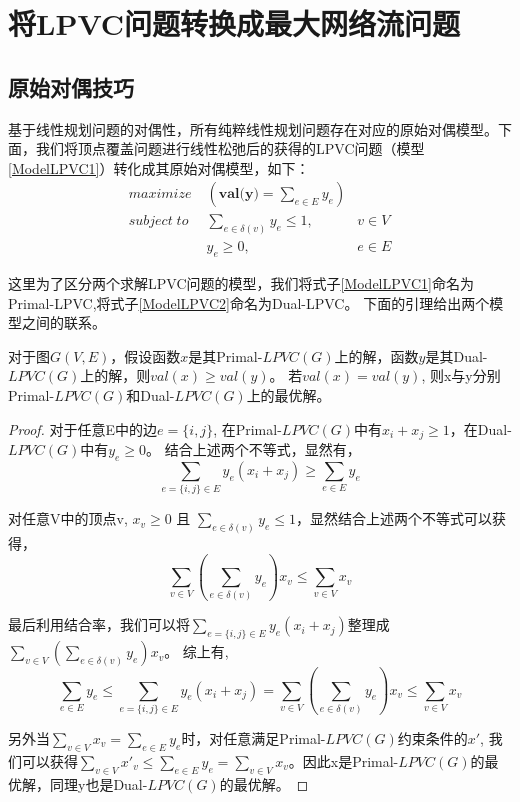 
\section{将LPVC问题转换成最大网络流问题}

\subsection{原始对偶技巧}
基于线性规划问题的对偶性，所有纯粹线性规划问题存在对应的原始对偶模型。下面，我们将顶点覆盖问题进行线性松弛后的获得的LPVC问题（模型\ref{ModelLPVC1}）转化成其原始对偶模型，如下：
\begin{equation} \label{ModelLPVC2} \begin{aligned}
  maximize\; & (\textbf{val(y)} = \sum_{e \in E}{y_e}) &\\
  subject\; to\; & \sum_{e \in \delta(v)}{y_e \le 1}, & v \in V \\
   & y_e \ge 0, & e \in E
\end{aligned} \end{equation}

这里为了区分两个求解LPVC问题的模型，我们将式子\ref{ModelLPVC1}命名为Primal-LPVC,将式子\ref{ModelLPVC2}命名为Dual-LPVC。
下面的引理给出两个模型之间的联系。
\begin{lemma} \label{relationBwtPrimalAndDual}
对于图$G(V, E)$，假设函数$x$是其Primal-$LPVC(G)$上的解，函数$y$是其Dual-$LPVC(G)$上的解，则$val(x) \ge val(y)$。
若$val(x) = val(y)$, 则x与y分别Primal-$LPVC(G)$和Dual-$LPVC(G)$上的最优解。
\end{lemma}
\begin{proof}
  对于任意E中的边$e = \{i, j\}$, 在Primal-$LPVC(G)$中有$x_i + x_j \ge 1$，在Dual-$LPVC(G)$中有$y_e \ge 0$。
  结合上述两个不等式，显然有，\[\sum\limits_{e=\{i, j\} \in E}{y_e(x_i + x_j)} \ge \sum\limits_{e \in E}{y_e}\]

  对任意V中的顶点v, $x_v \ge 0$ 且 $\sum_{e \in \delta(v)}{y_e} \le 1$，显然结合上述两个不等式可以获得，
  \[\sum\limits_{v \in V}{(\sum\limits_{e \in \delta(v)}{y_e})x_v} \le \sum\limits_{v \in V}{x_v}\]

  最后利用结合率，我们可以将$\sum_{e=\{i, j\} \in E}{y_e(x_i + x_j)}$整理成$\sum_{v \in V}{(\sum_{e \in \delta(v)}{y_e})x_v}$。
  综上有,
  \[
    \sum_{e \in E}{y_e} \le \sum_{e=\{i, j\} \in E}{y_e(x_i + x_j)}  = \sum_{v \in V}{(\sum_{e \in \delta(v)}{y_e})x_v} \le \sum_{v \in V}{x_v}
  \]

  另外当$\sum\limits_{v \in V}{x_v} = \sum\limits_{e \in E}{y_e}$时，对任意满足Primal-$LPVC(G)$约束条件的$x'$,
  我们可以获得$\sum\limits_{v \in V}{x'_v} \le \sum\limits_{e \in E}{y_e} = \sum\limits_{v \in V}{x_v}$。因此x是Primal-$LPVC(G)$的最优解，同理y也是Dual-$LPVC(G)$的最优解。
\end{proof}

